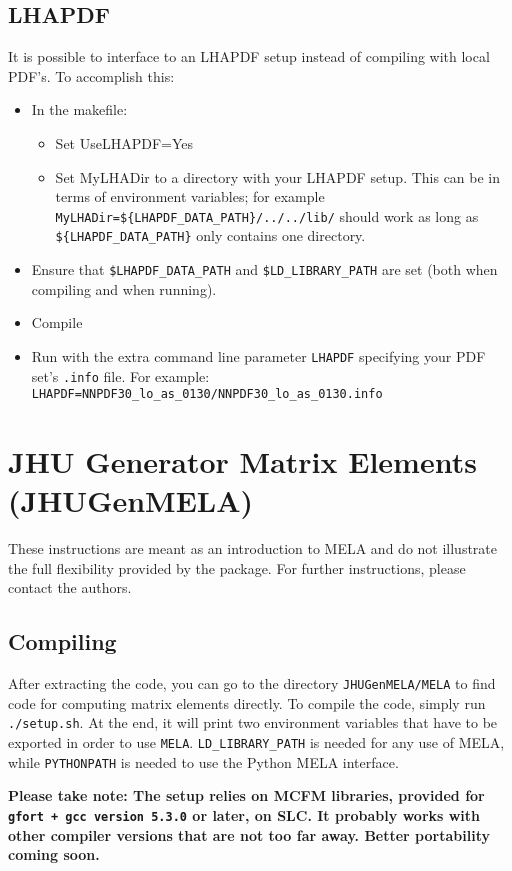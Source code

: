 \documentclass[aps,superscriptaddress,nofootinbib]{revtex4}
\begin{document}
\subsection{LHAPDF}
\label{sec:LHAPDF}

It is possible to interface to an LHAPDF setup instead of compiling with local PDF's.  To accomplish this:

\begin{itemize}
\item In the makefile:
\begin{itemize}
\item Set UseLHAPDF=Yes
\item Set MyLHADir to a directory with your LHAPDF setup.  This can be in terms of environment variables; for example \verb|MyLHADir=${LHAPDF_DATA_PATH}/../../lib/| should work as long as \verb|${LHAPDF_DATA_PATH}| only contains one directory.
\end{itemize}
\item Ensure that \verb|$LHAPDF_DATA_PATH| and \verb|$LD_LIBRARY_PATH| are set (both when compiling and when running).
\item Compile
\item Run with the extra command line parameter \verb|LHAPDF| specifying your PDF set's \verb|.info| file.  For example: \verb|LHAPDF=NNPDF30_lo_as_0130/NNPDF30_lo_as_0130.info|
\end{itemize}


\section{JHU Generator Matrix Elements (JHUGenMELA)}
These instructions are meant as an introduction to MELA and do not illustrate the full flexibility provided by the package.  For further instructions, please contact the authors.

\subsection{Compiling}
After extracting the code, you can go to the directory \texttt{JHUGenMELA/MELA} to find code for computing matrix elements directly.
To compile the code, simply run \texttt{./setup.sh}.  At the end, it will print two environment variables that have to be exported in order to use \texttt{MELA}.  \texttt{LD\_LIBRARY\_PATH} is needed for any use of MELA, while \texttt{PYTHONPATH} is needed to use the Python MELA interface.

\textbf{Please take note: The setup relies on MCFM libraries, provided for \texttt{gfort + gcc version 5.3.0} or later, on SLC.  It probably works with other compiler versions that are not too far away.  Better portability coming soon.}
\end{document}
